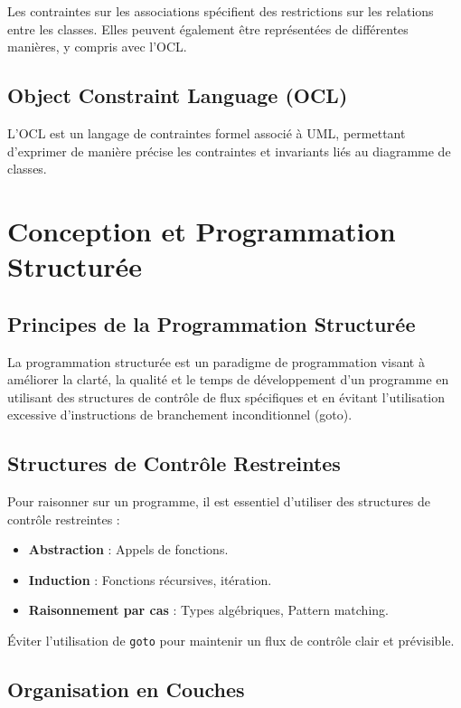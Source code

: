 \documentclass{article}
\begin{document}
\begin{itemize}
Les contraintes sur les associations spécifient des restrictions sur les relations entre les classes.  Elles peuvent également être représentées de différentes manières, y compris avec l'OCL.

\subsection{Object Constraint Language (OCL)}

L'OCL est un langage de contraintes formel associé à UML, permettant d'exprimer de manière précise les contraintes et invariants liés au diagramme de classes.

\section{Conception et Programmation Structurée}

\subsection{Principes de la Programmation Structurée}

La programmation structurée est un paradigme de programmation visant à améliorer la clarté, la qualité et le temps de développement d'un programme en utilisant des structures de contrôle de flux spécifiques et en évitant l'utilisation excessive d'instructions de branchement inconditionnel (goto).

\subsection{Structures de Contrôle Restreintes}

Pour raisonner sur un programme, il est essentiel d'utiliser des structures de contrôle restreintes :

\begin{itemize}
    \item \textbf{Abstraction} : Appels de fonctions.
    \item \textbf{Induction} : Fonctions récursives, itération.
    \item \textbf{Raisonnement par cas} : Types algébriques, Pattern matching.
    \end{itemize}

Éviter l'utilisation de \texttt{goto} pour maintenir un flux de contrôle clair et prévisible.

\subsection{Organisation en Couches}


\end{itemize}
\end{document}
